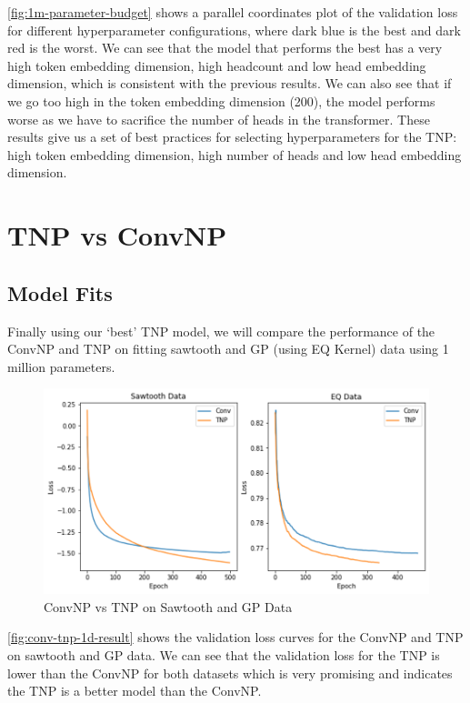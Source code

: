 \documentclass[../../main.tex]{subfiles}
\begin{document}
\autoref{fig:1m-parameter-budget} shows a parallel coordinates plot of the validation loss for different hyperparameter configurations, where dark blue is the best and dark red is the worst. We can see that the model that performs the best has a very high token embedding dimension, high headcount and low head embedding dimension, which is consistent with the previous results. We can also see that if we go too high in the token embedding dimension (200), the model performs worse as we have to sacrifice the number of heads in the transformer. These results give us a set of best practices for selecting hyperparameters for the TNP: high token embedding dimension, high number of heads and low head embedding dimension.





\section{TNP vs ConvNP}

\subsection{Model Fits}

Finally using our `best' TNP model, we will compare the performance of the ConvNP and TNP on fitting sawtooth and GP (using EQ Kernel) data using 1 million parameters. 


\begin{figure}[H]
	\centering
	\includegraphics[width=0.5\linewidth]{./result.png}
	\caption{ConvNP vs TNP on Sawtooth and GP Data}
	\label{fig:conv-tnp-1d-result}
\end{figure}

\autoref{fig:conv-tnp-1d-result} shows the validation loss curves for the ConvNP and TNP on sawtooth and GP data. We can see that the validation loss for the TNP is lower than the ConvNP for both datasets which is very promising and indicates the TNP is a better model than the ConvNP. 
\end{document}
